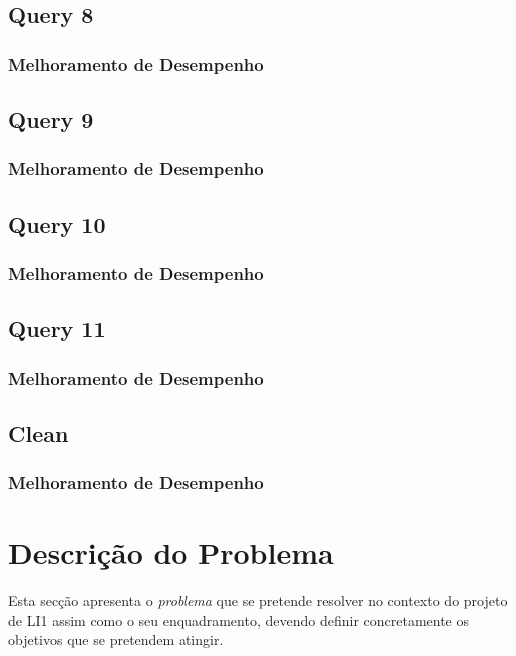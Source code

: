 \documentclass[a4paper]{article}
\begin{document}
\subsection{Query 8}

\subsubsection{Melhoramento de Desempenho}

\subsection{Query 9}

\subsubsection{Melhoramento de Desempenho}

\subsection{Query 10}

\subsubsection{Melhoramento de Desempenho}

\subsection{Query 11}

\subsubsection{Melhoramento de Desempenho}

\subsection{Clean}

\subsubsection{Melhoramento de Desempenho}


\section{Descrição do Problema}
\label{sec:problema}

Esta secção apresenta o \emph{problema} que se pretende resolver no
contexto do projeto de LI1 assim como o seu enquadramento, devendo
definir concretamente os objetivos que se pretendem atingir.
\end{document}
